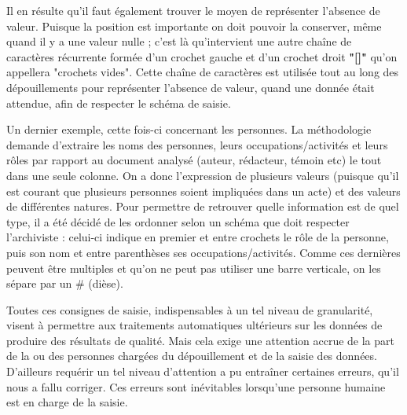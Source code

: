 Il en résulte qu'il faut également trouver le moyen de représenter l'absence de valeur. Puisque la position est importante on doit pouvoir la conserver, même quand il y a une valeur nulle ; c'est là qu'intervient une autre chaîne de caractères récurrente formée d'un crochet gauche et d'un crochet droit \textbf{"[]"}  qu'on appellera "crochets vides". Cette chaîne de caractères est utilisée tout au long des dépouillements pour représenter l'absence de valeur, quand une donnée était attendue, afin de respecter le schéma de saisie. 
\par
Un dernier exemple, cette fois-ci concernant les personnes. La méthodologie demande d'extraire les noms des personnes, leurs occupations/activités et leurs rôles par rapport au document analysé (auteur, rédacteur, témoin etc) le tout dans une seule colonne. On a donc l'expression de plusieurs valeurs (puisque qu'il est courant que plusieurs personnes soient impliquées dans un acte) et des valeurs de différentes natures. Pour permettre de retrouver quelle information est de quel type, il a été décidé de les ordonner selon un schéma que doit respecter l'archiviste : celui-ci indique en premier et entre crochets le rôle de la personne, puis son nom et entre parenthèses ses occupations/activités. Comme ces dernières peuvent être multiples et qu'on ne peut pas utiliser une barre verticale, on les sépare par un \# (dièse).
\par
Toutes ces consignes de saisie, indispensables à un tel niveau de granularité, visent à permettre aux traitements automatiques ultérieurs sur les données de produire des résultats de qualité. Mais cela exige une attention accrue de la part de la ou des personnes chargées du dépouillement et de la saisie des données. D'ailleurs requérir un tel niveau d'attention a pu entraîner certaines erreurs, qu'il nous a fallu corriger. Ces erreurs sont inévitables lorsqu'une personne humaine est en charge de la saisie. 